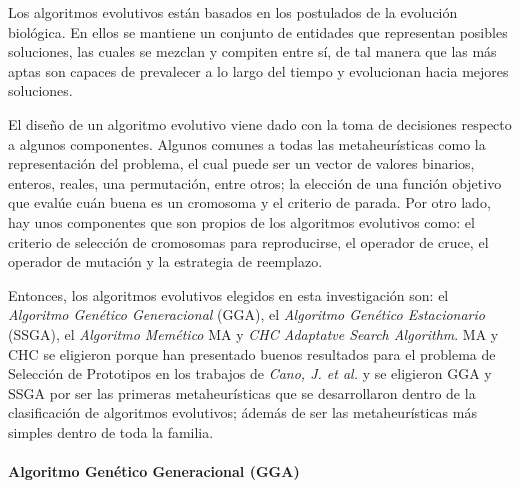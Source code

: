 Los algoritmos evolutivos \cite{talbi2009metaheuristics} están basados en los postulados de la evolución biológica. En ellos se mantiene un conjunto de entidades que representan posibles soluciones, las cuales se mezclan y compiten entre sí, de tal manera que las más aptas son capaces de prevalecer a lo largo del tiempo y evolucionan hacia mejores soluciones.

El diseño de un algoritmo evolutivo viene dado con la toma de decisiones respecto a algunos componentes. Algunos comunes a todas las metaheurísticas como la representación del problema, el cual puede ser un vector de valores binarios, enteros, reales, una permutación, entre otros; la elección de una función objetivo que evalúe cuán buena es un cromosoma y el criterio de parada. Por otro lado, hay unos componentes que son propios de los algoritmos evolutivos como: el criterio de selección de cromosomas para reproducirse, el operador de cruce, el operador de mutación y la estrategia de reemplazo.


Entonces, los algoritmos evolutivos elegidos en esta investigación son: el \emph{Algoritmo Genético Generacional} (GGA), el \emph{Algoritmo Genético Estacionario} (SSGA), el \emph{Algoritmo Memético} MA y \emph{CHC Adaptatve Search Algorithm}. MA y CHC se eligieron porque han presentado buenos resultados para el problema de Selección de Prototipos en los trabajos de \emph{Cano, J. et al.} \cite{garcia2012prototype, garcia2008memetic} y se eligieron GGA y SSGA por ser las primeras metaheurísticas que se desarrollaron dentro de la clasificación de algoritmos evolutivos; ádemás de ser las metaheurísticas más simples dentro de toda la familia.

\paragraph{Algoritmo Genético Generacional (GGA)}

